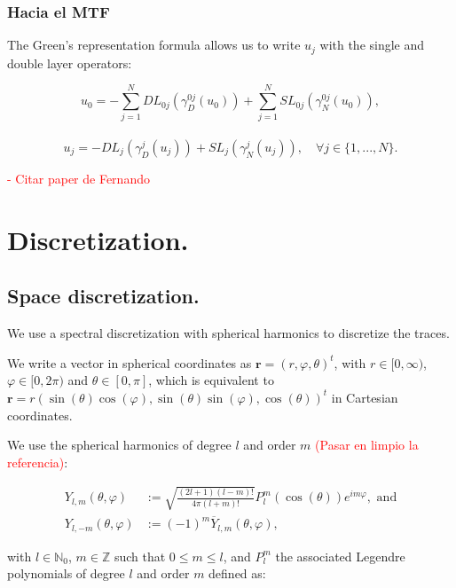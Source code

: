 \documentclass[]{article}%
\begin{document}
\subsubsection{Hacia el MTF}

The Green's representation formula allows us to write $u_j$ with the single and double layer operators:
 
$$u_0= - \sum_{j=1}^N DL_{0j} \left(\gamma_D^{0j} (u_0)\right) + \sum_{j=1}^N SL_{0j} \left(\gamma_{N}^{0j} \left(u_0\right)\right) ,$$\\

$$u_j=	-DL_j \left(\gamma_D^{j} \left(u_j\right)\right) +SL_j \left(\gamma_{N}^{j} \left(u_j\right) \right), \quad \forall j\in \{1, ..., N \}.$$

\textcolor{red}{- Citar paper de Fernando}


\section{Discretization.}

\subsection{Space discretization.}

We use a spectral discretization with spherical harmonics to discretize the traces.

We write a vector in spherical coordinates as $\mathbf{r}=\left(r,\varphi,\theta\right)^t$, with $r \in [0,\infty)$, $\varphi \in [0,2\pi)$ and $\theta \in [0,\pi]$, which is equivalent to $\mathbf{r}=r\left(\sin \left(\theta\right) \cos \left(\varphi\right),\sin \left(\theta\right) \sin \left(\varphi\right),\cos \left(\theta\right)\right)^t$ in Cartesian coordinates.

We use the spherical harmonics of degree $l$ and order $m$ \textcolor{red}{(Pasar en limpio la referencia)}: 

\begin{align}
 Y_{l,m}\left(\theta,\varphi\right) &:= \sqrt{ \frac{\left(2l+1\right)\left(l-m\right)!}{4 \pi \left(l+m\right)!}} P_l^{m} \left(\cos\left(\theta\right)\right) e^{i m \varphi}, \mbox{ and}  \\
 Y_{l,-m}\left(\theta,\varphi\right) &:= (-1)^m\overline{Y}_{l,m}\left(\theta,\varphi\right), 
\end{align}

with $l\in \mathbb{N}_0$, $m\in \mathbb{Z}$ such that $0\leq m\leq l$, and $P_l^m$ the associated Legendre polynomials of degree $l$ and  order $m$ defined as:
\end{document}
